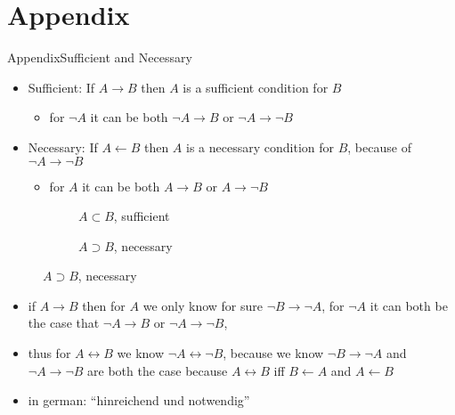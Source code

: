 
\section{Appendix}

\begin{frame}[allowframebreaks]{Appendix}{Sufficient and Necessary}
  \begin{itemize}
    \item \alert{Sufficient:} If $A\rightarrow B$ then $A$ is a sufficient condition for $B$
      \begin{itemize}
        \item for $\neg A$ it can be both $\neg A \rightarrow B$ or $\neg A \rightarrow \neg B$
      \end{itemize}
    \item \alert{Necessary:} If $A\leftarrow B$ then $A$ is a necessary condition for $B$, because of $\neg A \rightarrow \neg B$
      \begin{itemize}
        \item for $A$ it can be both $A \rightarrow B$ or $A \rightarrow \neg B$
      \end{itemize}
  \end{itemize}
  \begin{figure}
    \begin{subfigure}[t]{0.4\textwidth}
        \caption{$A \subset B$, sufficient}
    \end{subfigure}
    \begin{subfigure}[t]{0.4\textwidth}
      \caption{$A \supset B$, necessary}
    \end{subfigure}
  \end{figure}
  \begin{Sidenote}
    \begin{itemize}
      \item if $A\rightarrow B$ then for $A$ we \alert{only} know for sure $\neg B\rightarrow \neg A$, for $\neg A$ it can \alert{both} be the case that $\neg A\rightarrow B$ or $\neg A\rightarrow \neg B$,
      \item thus for $A\leftrightarrow B$ we know $\neg A\leftrightarrow \neg B$, because we know $\neg B\rightarrow \neg A$ and $\neg A\rightarrow \neg B$ are both the case because $A\leftrightarrow B$ \alert{iff} $B\leftarrow A$ and $A\leftarrow B$
      \item in \alert{german}: \enquote{hinreichend und notwendig}
    \end{itemize}
  \end{Sidenote}
\end{frame}
